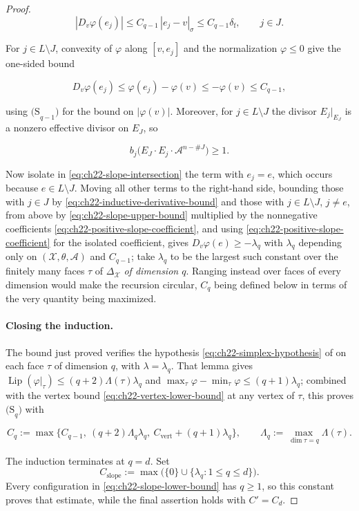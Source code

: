 \begin{proof}
\[
 |D_v\varphi(e_j)|\leq C_{q-1}\,|e_j-v|_\sigma
       \leq C_{q-1}\delta_{\mathrm f},
 \qquad j\in J .
\tag{22.48}\label{eq:ch22-inductive-derivative-bound}
\]

For $j\in L\setminus J$, convexity of $\varphi$ along $[v,e_j]$ and
the normalization $\varphi\leq0$ give the one-sided bound

\[
             D_v\varphi(e_j)
             \leq\varphi(e_j)-\varphi(v)\leq-\varphi(v)\leq C_{q-1},
\tag{22.49}\label{eq:ch22-slope-upper-bound}
\]

using $\mathrm{(S}_{q-1}\mathrm{)}$ for the bound on $|\varphi(v)|$.
Moreover, for $j\in L\setminus J$ the divisor $E_j|_{E_J}$ is a nonzero
effective divisor on $E_J$, so

\[
 b_j\bigl(E_J\cdot E_j\cdot\mathcal A^{n-\#J}\bigr)\geq1 .
\tag{22.50}\label{eq:ch22-positive-slope-coefficient}
\]

Now isolate in \eqref{eq:ch22-slope-intersection} the term with
$e_j=e$, which occurs because $e\in L\setminus J$.  Moving all other
terms to the right-hand side, bounding those with $j\in J$ by
\eqref{eq:ch22-inductive-derivative-bound} and those with
$j\in L\setminus J$, $j\neq e$, from above by
\eqref{eq:ch22-slope-upper-bound} multiplied by the nonnegative coefficients
\eqref{eq:ch22-positive-slope-coefficient}, and using
\eqref{eq:ch22-positive-slope-coefficient} for the isolated coefficient,
gives $D_v\varphi(e)\geq-\lambda_q$ with $\lambda_q$ depending only on
$(\mathcal X,\theta,\mathcal A)$ and $C_{q-1}$; take $\lambda_q$ to be
the largest such constant over the finitely many faces $\tau$ of
$\Delta_{\mathcal X}$ \emph{of dimension $q$}.  Ranging instead over
faces of every dimension would make the recursion circular, $C_{q}$ being
defined below in terms of the very quantity being maximized.

\paragraph{Closing the induction.}
The bound just proved verifies the hypothesis
\eqref{eq:ch22-simplex-hypothesis} of  on each face
$\tau$ of dimension $q$, with $\lambda=\lambda_q$.  That
lemma gives
$\operatorname{Lip}(\varphi|_\tau)\leq(q+2)\Lambda(\tau)\lambda_q$
and $\max_\tau\varphi-\min_\tau\varphi\leq(q+1)\lambda_q$;
combined with the vertex bound \eqref{eq:ch22-vertex-lower-bound} at any
vertex of $\tau$, this proves $\mathrm{(S}_q\mathrm{)}$ with

\[
 C_q:=\max\bigl\{C_{q-1},\ (q+2)\Lambda_q\lambda_q,\
       C_{\mathrm{vert}}+(q+1)\lambda_q\bigr\},
 \qquad
 \Lambda_q:=\max_{\dim\tau=q}\Lambda(\tau).
\tag{22.51}\label{eq:ch22-inductive-constant}
\]

The induction terminates at $q=d$.  Set
\[
 C_{\mathrm{slope}}
 :=\max\bigl(\{0\}\cup\{\lambda_q:1\leq q\leq d\}\bigr).
\]
Every configuration in \eqref{eq:ch22-slope-lower-bound} has
$q\geq1$, so this constant proves that estimate, while the final assertion
holds with $C'=C_d$.
\end{proof}

